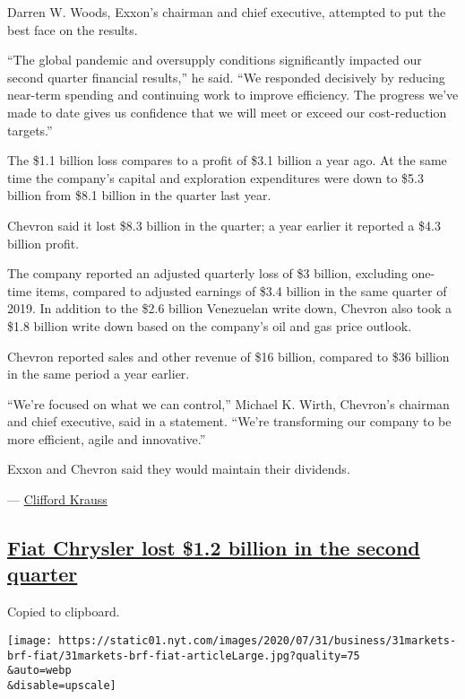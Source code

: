 Darren W. Woods, Exxon's chairman and chief executive, attempted to put
the best face on the results.

``The global pandemic and oversupply conditions significantly impacted
our second quarter financial results,'' he said. ``We responded
decisively by reducing near-term spending and continuing work to improve
efficiency. The progress we've made to date gives us confidence that we
will meet or exceed our cost-reduction targets.''

The \$1.1 billion loss compares to a profit of \$3.1 billion a year ago.
At the same time the company's capital and exploration expenditures were
down to \$5.3 billion from \$8.1 billion in the quarter last year.

Chevron said it lost \$8.3 billion in the quarter; a year earlier it
reported a \$4.3 billion profit.

The company reported an adjusted quarterly loss of \$3 billion,
excluding one-time items, compared to adjusted earnings of \$3.4 billion
in the same quarter of 2019. In addition to the \$2.6 billion Venezuelan
write down, Chevron also took a \$1.8 billion write down based on the
company's oil and gas price outlook.

Chevron reported sales and other revenue of \$16 billion, compared to
\$36 billion in the same period a year earlier.

``We're focused on what we can control,'' Michael K. Wirth, Chevron's
chairman and chief executive, said in a statement. ``We're transforming
our company to be more efficient, agile and innovative.''

Exxon and Chevron said they would maintain their dividends.

--- \href{https://www.nytimes.com/by/clifford-krauss}{Clifford Krauss}

\hypertarget{fiat-chrysler-lost-12-billion-in-the-second-quarter}{%
\subsection{\texorpdfstring{\protect\hyperlink{fiat-chrysler-lost-1-2-billion-in-the-second-quarter}{Fiat
Chrysler lost \$1.2 billion in the second
quarter}}{Fiat Chrysler lost \$1.2 billion in the second quarter}}\label{fiat-chrysler-lost-12-billion-in-the-second-quarter}}

Copied to clipboard.

\texttt{[image: https://static01.nyt.com/images/2020/07/31/business/31markets-brf-fiat/31markets-brf-fiat-articleLarge.jpg?quality=75\\\&auto=webp\\\&disable=upscale]}

